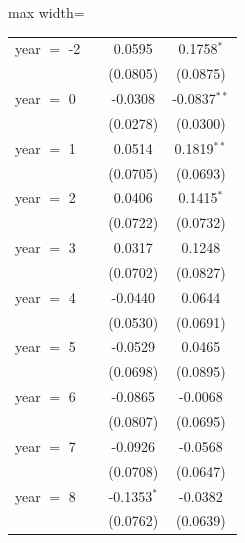 \begin{table}[!ht]
\begin{adjustbox}{max width=\textwidth}
\begin{tabular}{lccc}
      year $=$ -2               &                    & 0.0595               & 0.1758$^{*}$\\   
                                &                    & (0.0805)             & (0.0875)\\   
      year $=$ 0                &                    & -0.0308              & -0.0837$^{**}$\\   
                                &                    & (0.0278)             & (0.0300)\\   
      year $=$ 1                &                    & 0.0514               & 0.1819$^{**}$\\   
                                &                    & (0.0705)             & (0.0693)\\   
      year $=$ 2                &                    & 0.0406               & 0.1415$^{*}$\\   
                                &                    & (0.0722)             & (0.0732)\\   
      year $=$ 3                &                    & 0.0317               & 0.1248\\   
                                &                    & (0.0702)             & (0.0827)\\   
      year $=$ 4                &                    & -0.0440              & 0.0644\\   
                                &                    & (0.0530)             & (0.0691)\\   
      year $=$ 5                &                    & -0.0529              & 0.0465\\   
                                &                    & (0.0698)             & (0.0895)\\   
      year $=$ 6                &                    & -0.0865              & -0.0068\\   
                                &                    & (0.0807)             & (0.0695)\\   
      year $=$ 7                &                    & -0.0926              & -0.0568\\   
                                &                    & (0.0708)             & (0.0647)\\   
      year $=$ 8                &                    & -0.1353$^{*}$        & -0.0382\\   
                                &                    & (0.0762)             & (0.0639)\\   

\end{tabular}
\end{adjustbox}
\end{table}
